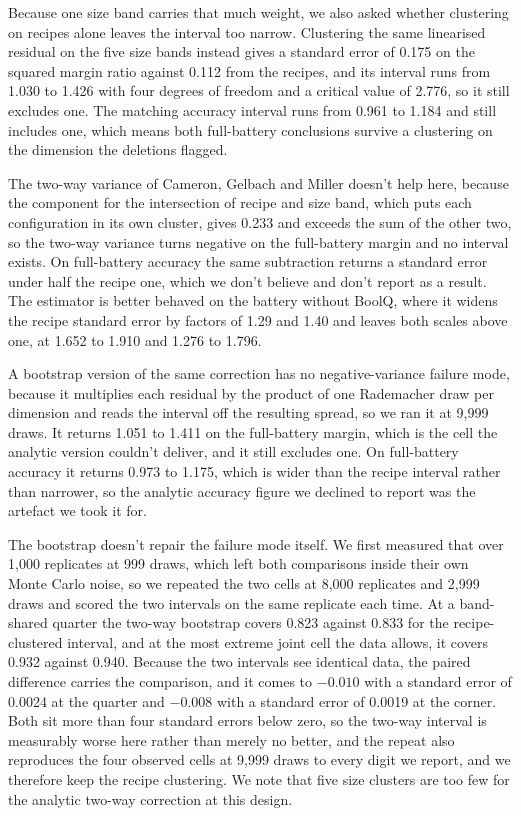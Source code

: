 Because one size band carries that much weight, we also asked whether clustering on recipes alone leaves the interval too narrow. Clustering the same linearised residual on the five size bands instead gives a standard error of 0.175 on the squared margin ratio against 0.112 from the recipes, and its interval runs from 1.030 to 1.426 with four degrees of freedom and a critical value of 2.776, so it still excludes one. The matching accuracy interval runs from 0.961 to 1.184 and still includes one, which means both full-battery conclusions survive a clustering on the dimension the deletions flagged.

The two-way variance of Cameron, Gelbach and Miller doesn't help here, because the component for the intersection of recipe and size band, which puts each configuration in its own cluster, gives 0.233 and exceeds the sum of the other two, so the two-way variance turns negative on the full-battery margin and no interval exists. On full-battery accuracy the same subtraction returns a standard error under half the recipe one, which we don't believe and don't report as a result. The estimator is better behaved on the battery without BoolQ, where it widens the recipe standard error by factors of 1.29 and 1.40 and leaves both scales above one, at 1.652 to 1.910 and 1.276 to 1.796.

A bootstrap version of the same correction has no negative-variance failure mode, because it multiplies each residual by the product of one Rademacher draw per dimension and reads the interval off the resulting spread, so we ran it at 9,999 draws. It returns 1.051 to 1.411 on the full-battery margin, which is the cell the analytic version couldn't deliver, and it still excludes one. On full-battery accuracy it returns 0.973 to 1.175, which is wider than the recipe interval rather than narrower, so the analytic accuracy figure we declined to report was the artefact we took it for.

The bootstrap doesn't repair the failure mode itself. We first measured that over 1,000 replicates at 999 draws, which left both comparisons inside their own Monte Carlo noise, so we repeated the two cells at 8,000 replicates and 2,999 draws and scored the two intervals on the same replicate each time. At a band-shared quarter the two-way bootstrap covers 0.823 against 0.833 for the recipe-clustered interval, and at the most extreme joint cell the data allows, it covers 0.932 against 0.940. Because the two intervals see identical data, the paired difference carries the comparison, and it comes to $-0.010$ with a standard error of 0.0024 at the quarter and $-0.008$ with a standard error of 0.0019 at the corner. Both sit more than four standard errors below zero, so the two-way interval is measurably worse here rather than merely no better, and the repeat also reproduces the four observed cells at 9,999 draws to every digit we report, and we therefore keep the recipe clustering. We note that five size clusters are too few for the analytic two-way correction at this design.

